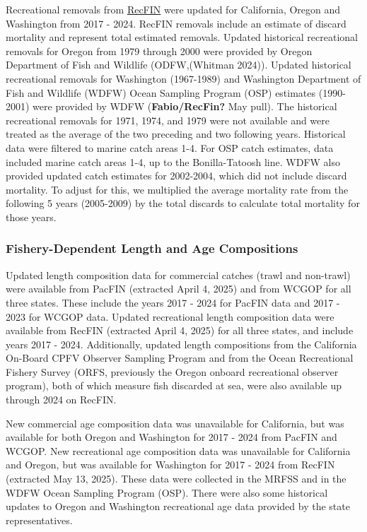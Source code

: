 \documentclass[
]{scrartcl}
\begin{document}
Recreational removals from \href{www.recfin.org}{RecFIN} were updated
for California, Oregon and Washington from 2017 - 2024. RecFIN removals
include an estimate of discard mortality and represent total estimated
removals. Updated historical recreational removals for Oregon from 1979
through 2000 were provided by Oregon Department of Fish and Wildlife
(ODFW,(Whitman 2024)). Updated historical recreational removals for
Washington (1967-1989) and Washington Department of Fish and Wildlife
(WDFW) Ocean Sampling Program (OSP) estimates (1990-2001) were provided
by WDFW (\textbf{Fabio/RecFin?} May pull). The historical recreational
removals for 1971, 1974, and 1979 were not available and were treated as
the average of the two preceding and two following years. Historical
data were filtered to marine catch areas 1-4. For OSP catch estimates,
data included marine catch areas 1-4, up to the Bonilla-Tatoosh line.
WDFW also provided updated catch estimates for 2002-2004, which did not
include discard mortality. To adjust for this, we multiplied the average
mortality rate from the following 5 years (2005-2009) by the total
discards to calculate total mortality for those years.

\subsubsection{Fishery-Dependent Length and Age
Compositions}\label{sec-fd_comps}

Updated length composition data for commercial catches (trawl and
non-trawl) were available from PacFIN (extracted April 4, 2025) and from
WCGOP for all three states. These include the years 2017 - 2024 for
PacFIN data and 2017 - 2023 for WCGOP data. Updated recreational length
composition data were available from RecFIN (extracted April 4, 2025)
for all three states, and include years 2017 - 2024. Additionally,
updated length compositions from the California On-Board CPFV Observer
Sampling Program and from the Ocean Recreational Fishery Survey (ORFS,
previously the Oregon onboard recreational observer program), both of
which measure fish discarded at sea, were also available up through 2024
on RecFIN.

New commercial age composition data was unavailable for California, but
was available for both Oregon and Washington for 2017 - 2024 from PacFIN
and WCGOP. New recreational age composition data was unavailable for
California and Oregon, but was available for Washington for 2017 - 2024
from RecFIN (extracted May 13, 2025). These data were collected in the
MRFSS and in the WDFW Ocean Sampling Program (OSP). There were also some
historical updates to Oregon and Washington recreational age data
provided by the state representatives.
\end{document}
